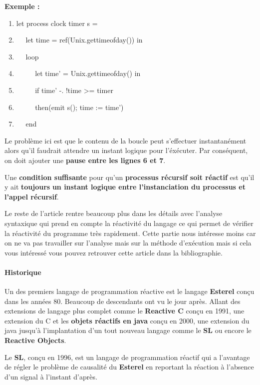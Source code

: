 \documentclass[10pt,a4paper]{article}
\begin{document}
				\textbf{Exemple :}
				\smallbreak
				\begin{enumerate}
				 	\item let process clock timer s =
				 	\item $\quad$ let time = ref(Unix.gettimeofday()) in
				 	\item $\quad$ loop
				 	\item $\quad$ $\quad$ let time' = Unix.gettimeofday() in
				 	\item $\quad$ $\quad$ if time' -. !time >= timer
				 	\item $\quad$ $\quad$ then(emit s(); time := time')
				 	\item $\quad$ end 
			 	\end{enumerate}
				\medbreak
					
				Le probl\`{e}me ici est que le contenu de la boucle peut s'effectuer instantan\'{e}ment alors qu'il faudrait attendre un instant logique pour l'éxécuter. Par conséquent, on doit ajouter une \textbf{pause entre les lignes 6 et 7}.
				\bigbreak
					
				Une \textbf{condition suffisante} pour qu'un \textbf{processus r\'{e}cursif soit r\'{e}actif} est qu'il y ait \textbf{toujours} \textbf{un instant logique entre l'instanciation du processus et l'appel r\'{e}cursif}.
				\bigbreak
					
					
				Le reste de l'article rentre beaucoup plus dans les détails avec l'analyse syntaxique qui prend en compte la réactivité du langage ce qui permet de vérifier la réactivité du programme très rapidement. Cette partie nous intéresse moins car on ne va pas travailler sur l'analyse mais sur la méthode d'exécution mais si cela vous intéressé vous pouvez retrouver cette article dans la bibliographie.
			
				\newpage
				\paragraph{Historique}
				 Un des premiers langage de programmation réactive est le langage \textbf{Esterel} conçu dans les années 80. Beaucoup de descendants ont vu le jour après. Allant des extensions de langage plus complet comme le \textbf{Reactive C} conçu en 1991, une extension du C et les \textbf{objets réactifs en java} conçu en 2000, une extension du java jusqu'à l'implantation d'un tout nouveau langage comme le \textbf{SL} ou encore le \textbf{Reactive Objects}. 
				\medbreak
				
				Le \textbf{SL}, conçu en 1996, est un langage de programmation réactif qui a l'avantage de régler le problème de causalité du \textbf{Esterel} en reportant la réaction à l'absence d'un signal à l'instant d'après.
				\medbreak
				
\end{document}
